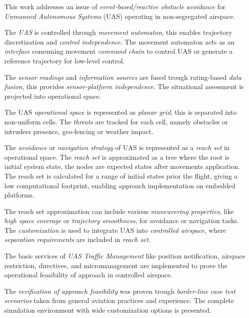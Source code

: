 \setcounter{chapter}{0}
\setcounter{section}{0}
\setcounter{subsection}{0}

\noindent This work addresses an issue of \emph{event-based/reactive obstacle avoidance} for \emph{Unmanned Autonomous Systems} (UAS) operating in non-segregated airspace. 

The \emph{UAS} is controlled through \emph{movement automaton}, this enables trajectory discretization and \emph{control independence}. The movement automaton acts as an \emph{interface} consuming movement \emph{command chain} to control UAS or generate a reference trajectory for low-level control.

The \emph{sensor readings} and \emph{information sources} are fused trough rating-based \emph{data fusion}, this provides \emph{sensor-platform independence}. The situational assessment is projected into operational space.

The UAS \emph{operational space} is represented as \emph{planar grid}, this is separated into non-uniform cells. The \emph{threats} are tracked for each cell, namely obstacles or intruders presence, geo-fencing or weather impact. 

The \emph{avoidance} or \emph{navigation strategy} of UAS is represented as a \emph{reach set} in operational space. The \emph{reach set} is approximated as a tree where the root is initial system state, the nodes are expected states after movements application. The reach set is calculated for a range of initial states prior the flight, giving a low computational footprint, enabling approach implementation on embedded platforms. 

The reach set approximation can include various \emph{maneuvering properties}, like \emph{high space coverage} or \emph{trajectory smoothness}, for avoidance or navigation tasks. The \emph{customization} is used to integrate UAS into \emph{controlled airspace}, where \emph{separation requirements} are included in \emph{reach set}.

The basic services of \emph{UAS Traffic Management} like position notification, airspace restriction, directives, and micromanagement are implemented to prove the operational feasibility of approach in controlled airspace. 

The \emph{verification of approach feasibility} was proven trough \emph{border-line case test scenarios} taken from general aviation practices and experience. The complete simulation environment with wide customization options is presented.
